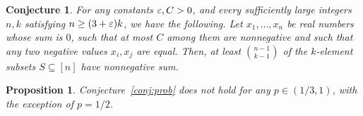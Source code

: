 \documentclass[12pt]{article}
\theoremstyle{plain}
{\theorembodyfont{\slshape}
\newtheorem{theorem}{Theorem}[section]
\newtheorem{lemma}[theorem]{Lemma}
\newtheorem{corollary}[theorem]{Corollary}}
\newtheorem{conjecture}[theorem]{Conjecture}
\newtheorem{proposition}[theorem]{Proposition}
\begin{document}
\begin{conjecture}
\label{q:MMS_variant}
For any constants $\varepsilon, C>0$, and every sufficiently large integers $n, k$ satisfying $n\geq (3+\varepsilon)k$, we have the following. Let $x_1, \dots, x_n$ be real numbers whose sum is $0$, such that at most $C$ among them are nonnegative and such that any two negative values $x_i, x_j$ are equal. Then, at least $\binom{n-1}{k-1}$ of the $k$-element subsets $S\subseteq [n]$ have nonnegative sum.
\end{conjecture}

\begin{proposition}\label{prop:counterexample}
Conjecture~\ref{conj:prob} does not hold for any $p\in (1/3, 1)$, with the exception of $p=1/2$.
\end{proposition}

\endgroup



\end{document}
